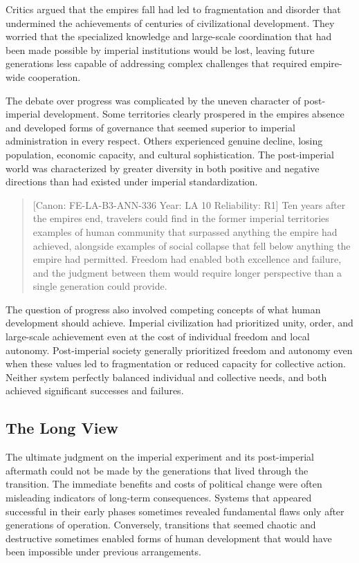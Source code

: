 Critics argued that the empire\textquotesingle s fall had led to
fragmentation and disorder that undermined the achievements of centuries
of civilizational development. They worried that the specialized
knowledge and large-scale coordination that had been made possible by
imperial institutions would be lost, leaving future generations less
capable of addressing complex challenges that required empire-wide
cooperation.

The debate over progress was complicated by the uneven character of
post-imperial development. Some territories clearly prospered in the
empire\textquotesingle s absence and developed forms of governance that
seemed superior to imperial administration in every respect. Others
experienced genuine decline, losing population, economic capacity, and
cultural sophistication. The post-imperial world was characterized by
greater diversity in both positive and negative directions than had
existed under imperial standardization.

\begin{quote}
{[}Canon: FE-LA-B3-ANN-336 \textbar{} Year: LA 10 \textbar{}
Reliability: R1{]} Ten years after the empire\textquotesingle s end,
travelers could find in the former imperial territories examples of
human community that surpassed anything the empire had achieved,
alongside examples of social collapse that fell below anything the
empire had permitted. Freedom had enabled both excellence and failure,
and the judgment between them would require longer perspective than a
single generation could provide.
\end{quote}

The question of progress also involved competing concepts of what human
development should achieve. Imperial civilization had prioritized unity,
order, and large-scale achievement even at the cost of individual
freedom and local autonomy. Post-imperial society generally prioritized
freedom and autonomy even when these values led to fragmentation or
reduced capacity for collective action. Neither system perfectly
balanced individual and collective needs, and both achieved significant
successes and failures.

\subsection{The Long View}\label{the-long-view}

The ultimate judgment on the imperial experiment and its post-imperial
aftermath could not be made by the generations that lived through the
transition. The immediate benefits and costs of political change were
often misleading indicators of long-term consequences. Systems that
appeared successful in their early phases sometimes revealed fundamental
flaws only after generations of operation. Conversely, transitions that
seemed chaotic and destructive sometimes enabled forms of human
development that would have been impossible under previous arrangements.

